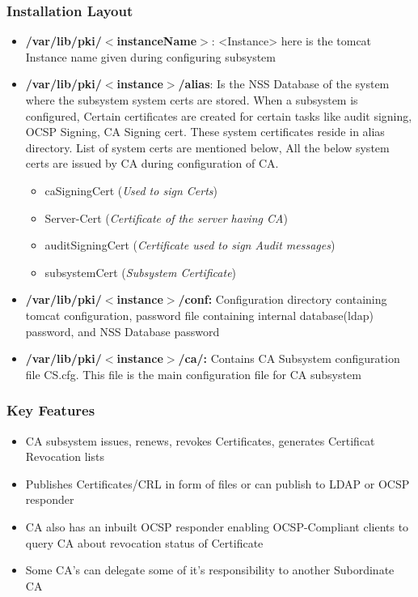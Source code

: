 \documentclass[12pt]{report}
\begin{document}
\subsubsection{Installation Layout}
    \begin{itemize}
        \item \textbf{/var/lib/pki/$<$instanceName$>$}: <Instance> here is the tomcat Instance name given during configuring subsystem
        \item \textbf{/var/lib/pki/$<$instance$>$/alias}: Is the NSS Database of the system where the subsystem system certs are stored.
            When a subsystem is configured, Certain certificates are created for certain tasks like audit signing, OCSP Signing, CA Signing cert.
            These system certificates reside in alias directory. List of system certs are mentioned below, All the below system certs are issued by
            CA during configuration of CA.
            \begin{itemize}
                \item caSigningCert (\textit{Used to sign Certs})
                \item Server-Cert (\textit{Certificate of the server having CA})
                \item auditSigningCert (\textit{Certificate used to sign Audit messages})
                \item subsystemCert (\textit{Subsystem Certificate})
            \end{itemize}
        \item \textbf{/var/lib/pki/$<$instance$>$/conf:} Configuration directory containing
            tomcat configuration, password file containing internal database(ldap) password, 
            and NSS Database password
        \item \textbf{/var/lib/pki/$<$instance$>$/ca/:} Contains CA Subsystem configuration 
                file CS.cfg. This file is the main configuration file for CA subsystem
    \end{itemize}
\subsubsection{Key Features}
    \begin{itemize}
        \item CA subsystem issues, renews, revokes Certificates, generates Certificat Revocation lists
        \item Publishes Certificates/CRL in form of files or can publish to LDAP or OCSP responder
        \item CA also has an inbuilt OCSP responder enabling OCSP-Compliant clients to query CA about revocation status of Certificate
        \item Some CA's can delegate some of it's responsibility to another Subordinate CA
    \end{itemize}
\end{document}
